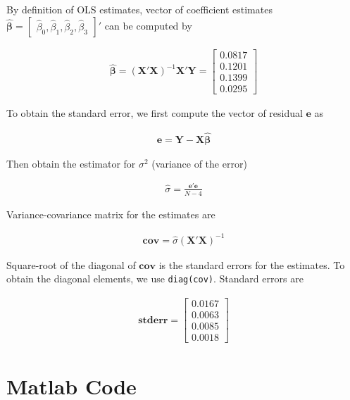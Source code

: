 \documentclass[11pt,letter]{article}
\newcommand{\vect}[1]{\boldsymbol{\mathbf{#1}}}
\newcounter{lem}[section] \setcounter{lem}{0}
\newcommand{\prn}[1]{\left({#1}\right)}
\newcommand{\bmat}[1]{\begin{bmatrix} #1 \end{bmatrix}}%
\newcommand{\code}[1]{\texttt{#1}}
\begin{document}
By definition of OLS estimates, vector of coefficient estimates $\hat{\vect{\beta}}=\bmat{\hat{\beta}_0,\hat{\beta}_1,\hat{\beta}_2,\hat{\beta}_3}'$ can be computed by

\begin{align*}
\hat{\vect{\beta}} =\prn{\vect{X}'\vect{X}}^{-1}\vect{X}'\vect{Y} = \left[\begin{array}{r} 0.0817\\ 0.1201\\ 0.1399\\ 0.0295 \end{array}\right]
\end{align*}

To obtain the standard error, we first compute the vector of residual $\vect{e}$ as

\begin{align*}
\vect{e} = \vect{Y} - \vect{X}\hat{\vect{\beta}} 
\end{align*}

Then obtain the estimator for $\sigma^2$ (variance of the error)

\begin{align*}
\hat{\sigma} = \frac{\vect{e}'\vect{e}}{N-4}
\end{align*}

Variance-covariance matrix for the estimates are 


\begin{align*}
\vect{cov} = \hat{\sigma} (\vect{X}'\vect{X})^{-1}
\end{align*}

Square-root of the diagonal of $\vect{cov}$ is the standard errors for the estimates. To obtain the diagonal elements, we use \code{diag(cov)}. Standard errors are

\begin{align*}
\vect{stderr} = \left[\begin{array}{c} 0.0167\\ 0.0063\\ 0.0085\\ 0.0018 \end{array}\right]
\end{align*}


\section*{Matlab Code}

\end{document}
